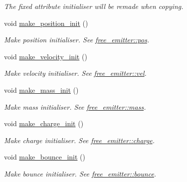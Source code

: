 \begin{DoxyCompactItemize}
\begin{DoxyCompactList}\small\item\em The fixed attribute initialiser will be remade when copying. \end{DoxyCompactList}\item 
void \hyperlink{classphysim_1_1emitters_1_1free__emitters_1_1multisource_a733668bafd378a28fb4c83228f66da9f}{make\+\_\+position\+\_\+init} ()
\begin{DoxyCompactList}\small\item\em Make position initialiser. See \hyperlink{classphysim_1_1emitters_1_1base__emitter_ac67584a2ca34232c1f4f04c41599df0e}{free\+\_\+emitter\+::pos}. \end{DoxyCompactList}\item 
void \hyperlink{classphysim_1_1emitters_1_1free__emitters_1_1multisource_a638cc70a85d14ec5cc836f4b58611a3a}{make\+\_\+velocity\+\_\+init} ()
\begin{DoxyCompactList}\small\item\em Make velocity initialiser. See \hyperlink{classphysim_1_1emitters_1_1base__emitter_a9ea19d96450cff65882371b61a2294c8}{free\+\_\+emitter\+::vel}. \end{DoxyCompactList}\item 
void \hyperlink{classphysim_1_1emitters_1_1free__emitters_1_1multisource_aecd70362b2df41276206a600c55a78a8}{make\+\_\+mass\+\_\+init} ()
\begin{DoxyCompactList}\small\item\em Make mass initialiser. See \hyperlink{classphysim_1_1emitters_1_1base__emitter_a4e1b65730afef86899544d3306f7547d}{free\+\_\+emitter\+::mass}. \end{DoxyCompactList}\item 
void \hyperlink{classphysim_1_1emitters_1_1free__emitters_1_1multisource_adf1381635d55a57009d6e71a13c743d8}{make\+\_\+charge\+\_\+init} ()
\begin{DoxyCompactList}\small\item\em Make charge initialiser. See \hyperlink{classphysim_1_1emitters_1_1free__emitter_a895244d2023c4cc72658d356bdb51b9a}{free\+\_\+emitter\+::charge}. \end{DoxyCompactList}\item 
void \hyperlink{classphysim_1_1emitters_1_1free__emitters_1_1multisource_a0f49d5a98f7ab5be200ec471ed71258e}{make\+\_\+bounce\+\_\+init} ()
\begin{DoxyCompactList}\small\item\em Make bounce initialiser. See \hyperlink{classphysim_1_1emitters_1_1free__emitter_a71006743e284b12904d7a4b4127ab4b8}{free\+\_\+emitter\+::bounce}. \end{DoxyCompactList}\item 

\end{DoxyCompactItemize}
